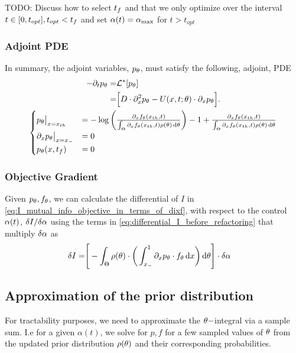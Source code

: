 \documentclass{article}
\begin{document}
\def \topt {{ t_{opt}}}

TODO: Discuss how to select ${t_f}$ and that we only optimize over the
interval$ t\in [0, \topt], \topt<\tf$ and set ${\alpha}(t) = { {\alpha}_{\textrm{max}} }$ for $t>\topt$

\subsubsection{Adjoint PDE}
In summary, the adjoint variables, $p_{\theta}$, must satisfy the following, adjoint,
PDE
\begin{equation}
\begin{gathered}
\begin{aligned}
-\di_t p_\th =&  \Lstar[p_\th]
\\ 		=&  \Big[ D\cdot \di^2_x p_\th - U(x,t;\th)   \cdot \di_x p_\th \Big].
\end{aligned}
\\
\begin{cases}
	p_\th \big|_{x=\xth} &=  -\log\left( \frac{\di_xf_\th(\xth, t)}
						{\int_\Theta \di_xf_\th(\xth, t)\rho(\th)\intd{\th} } \right) 
							- 1 
							+ \frac{\di_xf_\th(\xth, t)}
				   					{\int_\Theta \di_xf_\th(\xth, t)\rho(\th)\intd{\th} } $$
	\\
	\di_x p_\th  \big|_{x=\xmin} &= 0
	\\
	p_\th(x,\tf) &= 0
\end{cases}
\label{eq:adjoint_pde_OU}
\end{gathered}
\end{equation}

\subsubsection{Objective Gradient}
Given $p_{\theta}, f_{\theta}$, we can calculate the differential of $I$ in
\cref{eq:I_mutual_info_objective_in_terms_of_dixf}, with respect to the
control ${\alpha}(t)$, $\delta I / \delta {\alpha}$ using the terms in
\cref{eq:differential_I_before_refactoring} that multiply $\delta {\alpha}$ as 
\begin{align}
\delta I =&  \Bigg[ 
-\int_\Theta  \rho({\theta}) \cdot \bigg(  
 \int_{ x_{-} }^{1} {\partial}_x p_{\theta} \cdot f_{\theta} \, \mathrm{d} x 
    \bigg) \, \mathrm{d} {\theta} \Bigg]\cdot \delta {\alpha}
    \label{eq:objective_gradient_continuous}
\end{align}

\subsection{Approximation of the prior distribution}
For tractability purposes, we need to approximate the ${\theta}-$integral via a
sample sum. I.e for a given $\alpha(t)$, we solve for $p,f$ for a few sampled
values of ${\theta}$ from the updated prior distribution $\rho({\theta})$ and their
corresponding probabilities.
\end{document}
